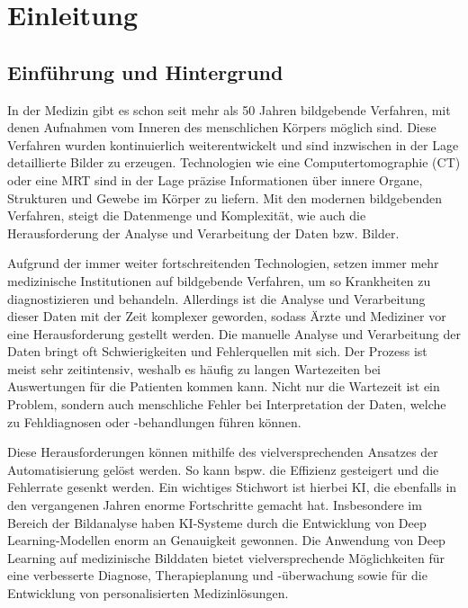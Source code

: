 
\chapter{Einleitung}
\section{Einführung und Hintergrund}
In der Medizin gibt es schon seit mehr als 50 Jahren bildgebende Verfahren, mit denen Aufnahmen vom Inneren des menschlichen Körpers möglich sind. Diese Verfahren wurden kontinuierlich weiterentwickelt und sind inzwischen in der Lage detaillierte Bilder zu erzeugen. Technologien wie eine Computertomographie (CT) oder eine \ac{MRT} sind in der Lage präzise Informationen über innere Organe, Strukturen und Gewebe im Körper zu liefern. \cite[vgl.][]{Heinrichs2022} Mit den modernen bildgebenden Verfahren, steigt die Datenmenge und Komplexität, wie auch die Herausforderung der Analyse und Verarbeitung der Daten bzw. Bilder. 

Aufgrund der immer weiter fortschreitenden Technologien, setzen immer mehr medizinische Institutionen auf bildgebende Verfahren, um so Krankheiten zu diagnostizieren und behandeln. Allerdings ist die Analyse und Verarbeitung dieser Daten mit der Zeit komplexer geworden, sodass Ärzte und Mediziner vor eine Herausforderung gestellt werden. Die manuelle Analyse und Verarbeitung der Daten bringt oft Schwierigkeiten und Fehlerquellen mit sich. Der Prozess ist meist sehr zeitintensiv, weshalb es häufig zu langen Wartezeiten bei Auswertungen für die Patienten kommen kann. Nicht nur die Wartezeit ist ein Problem, sondern auch menschliche Fehler bei Interpretation der Daten, welche zu Fehldiagnosen oder -behandlungen führen können. \cite[vgl.][]{Ramsundar2020}

Diese Herausforderungen können mithilfe des vielversprechenden Ansatzes der Automatisierung gelöst werden. So kann bspw. die Effizienz gesteigert und die Fehlerrate gesenkt werden. Ein wichtiges Stichwort ist hierbei \ac{KI}, die ebenfalls in den vergangenen Jahren enorme Fortschritte gemacht hat. Insbesondere im Bereich der Bildanalyse haben \ac{KI}-Systeme durch die Entwicklung von Deep Learning-\gls{Modell}en enorm an Genauigkeit gewonnen. Die Anwendung von Deep Learning auf medizinische Bilddaten bietet vielversprechende Möglichkeiten für eine verbesserte Diagnose, Therapieplanung und -überwachung sowie für die Entwicklung von personalisierten Medizinlösungen. 

